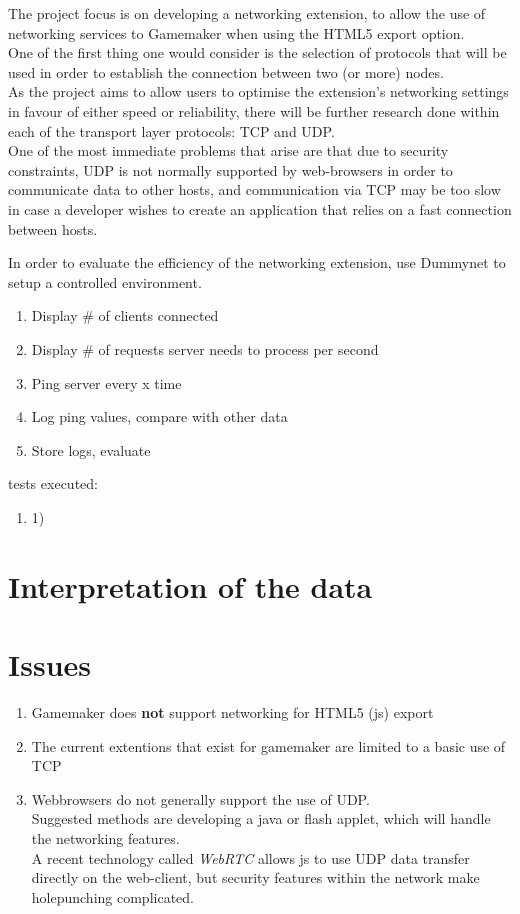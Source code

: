 \documentclass[12pt]{article}
\begin{document}
The project focus is on developing a networking extension, to allow the use of networking services to Gamemaker when using the HTML5 export option.\\
One of the first thing one would consider is the selection of protocols that will be used in order to establish the connection between two (or more) nodes.\\
As the project aims to allow users to optimise the extension's networking settings in favour of either speed or reliability, there will be further research done within each of the transport layer protocols: TCP and UDP.\\
One of the most immediate problems that arise are that due to security constraints, UDP is not normally supported by web-browsers in order to communicate data to other hosts, and communication via TCP may be too slow in case a developer wishes to create an application that relies on a fast connection between hosts.

In order to evaluate the efficiency of the networking extension, use Dummynet to setup a controlled environment.

\begin{enumerate}
\item Display \# of clients connected
\item Display \# of requests server needs to process per second
\item Ping server every x time
\item Log ping values, compare with other data
\item Store logs, evaluate
\end{enumerate}

tests executed:
\begin{enumerate}
\item 1) 
\end{enumerate}

\section{Interpretation of the data}

\section{Issues}
\begin{enumerate}
\item Gamemaker does \textbf{not} support networking for HTML5 (js) export
\item The current extentions that exist for gamemaker are limited to a basic use of TCP
\item Webbrowsers do not generally support the use of UDP.
\\Suggested methods are developing a java or flash applet, which will handle the networking features.
\\A recent technology called \emph{WebRTC} allows js to use UDP data transfer directly on the web-client, but security features  within the network make holepunching complicated.
\end{enumerate} 
\end{document}
